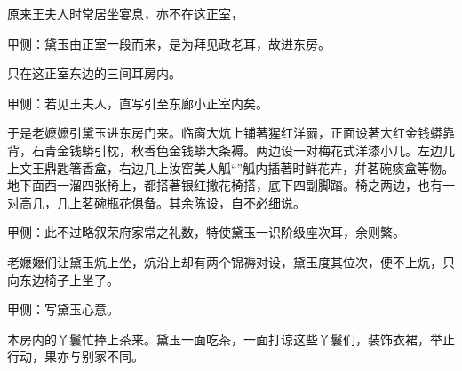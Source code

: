 \begin{parag}
    原来王夫人时常居坐宴息，亦不在这正室，\begin{note}甲侧：黛玉由正室一段而来，是为拜见政老耳，故进东房。\end{note}只在这正室东边的三间耳房内。\begin{note}甲侧：若见王夫人，直写引至东廊小正室内矣。\end{note}于是老嬷嬷引黛玉进东房门来。临窗大炕上铺著猩红洋罽，正面设著大红金钱蟒靠背，石青金钱蟒引枕，秋香色金钱蟒大条褥。两边设一对梅花式洋漆小几。左边几上文王鼎匙箸香盒，右边几上汝窑美人觚“”觚内插著时鲜花卉，幷茗碗痰盒等物。地下面西一溜四张椅上，都搭著银红撒花椅搭，底下四副脚踏。椅之两边，也有一对高几，几上茗碗瓶花俱备。其余陈设，自不必细说。\begin{note}甲侧：此不过略叙荣府家常之礼数，特使黛玉一识阶级座次耳，余则繁。\end{note}老嬷嬷们让黛玉炕上坐，炕沿上却有两个锦褥对设，黛玉度其位次，便不上炕，只向东边椅子上坐了。\begin{note}甲侧：写黛玉心意。\end{note}本房内的丫鬟忙捧上茶来。黛玉一面吃茶，一面打谅这些丫鬟们，装饰衣裙，举止行动，果亦与别家不同。
\end{parag}


